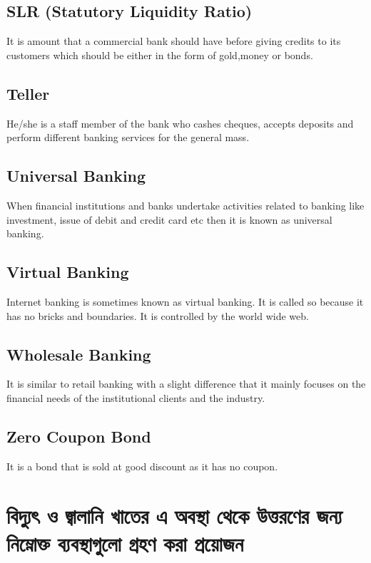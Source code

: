 \documentclass[11pt]{article}
\begin{document}
\subsection{SLR (Statutory Liquidity Ratio)}
\label{sec:org3a7c5ad}
It is amount that a commercial bank should have before giving credits
to its customers which should be either in the form of gold,money or
bonds.
\subsection{Teller}
\label{sec:org91d6486}
He/she is a staff member of the bank who cashes cheques, accepts
deposits and perform different banking services for the general mass.
\subsection{Universal Banking}
\label{sec:org4c8c2dc}
When financial institutions and banks undertake activities related to
banking like investment, issue of debit and credit card etc then it is
known as universal banking.
\subsection{Virtual Banking}
\label{sec:org62e757f}
Internet banking is sometimes known as virtual banking. It is called
so because it has no bricks and boundaries. It is controlled by the
world wide web.
\subsection{Wholesale Banking}
\label{sec:org66dbbf4}
It is similar to retail banking with a slight difference that it
mainly focuses on the financial needs of the institutional clients and
the industry.
\subsection{Zero Coupon Bond}
\label{sec:org9bdc324}
It is a bond that is sold at good discount as it has no coupon.

\section{বিদ্যুৎ ও জ্বালানি খাতের এ অবস্থা থেকে উত্তরণের জন্য নিম্নোক্ত ব্যবস্থাগুলো গ্রহণ করা প্রয়োজন}
\label{sec:org70b2956}
\end{document}
